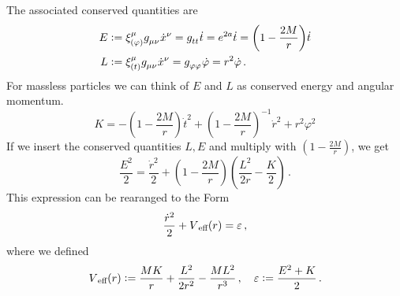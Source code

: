 The associated conserved quantities are
\begin{align}
E&:=\tensor*{\xi}{_{(\varphi)}^\mu}\tensor{g}{_\mu_\nu}\tensor{\dot{x}}{^\nu}
=\tensor{g}{_t_t}\dot{t}
=e^{2a}\dot{t}
=\left(1-\frac{2M}{r}\right)\dot{t}
\\
L&:=\tensor*{\xi}{_{(t)}^\mu}\tensor{g}{_\mu_\nu}\tensor{\dot{x}}{^\nu}
=\tensor{g}{_\varphi_\varphi}\dot{\varphi}
=r^2\dot{\varphi}\,.
\end{align}
For massless
particles we can think of $E$ and $L$ as conserved energy and angular momentum.
\begin{equation}
K=-\left(1-\frac{2M}{r}\right)\dot{t}^2+\left(1-\frac{2M}{r}\right)^{-1}\dot{r}^2+r^2\varphi^2
\end{equation}
If we insert the conserved quantities $L,E$ and multiply with
$\left(1-\frac{2M}{r}\right)$, we get
\begin{equation}
\frac{E^2}{2}=\frac{\dot{r}^2}{2}
+\left(1-\frac{2M}{r}\right)\left(\frac{L^2}{2r}-\frac{K}{2}\right)\,.
\end{equation}
This expression can be rearanged to the Form
\begin{equation}
\frac{\dot{r}^2}{2}+V\textsubscript{eff}(r)
=\varepsilon\,,
\end{equation}
where we defined
\begin{equation}
V\textsubscript{eff}(r):=\frac{MK}{r}+\frac{L^2}{2r^2}-\frac{ML^2}{r^3}\,,\quad
\varepsilon:=\frac{E^2+K}{2}\,.
\end{equation}
